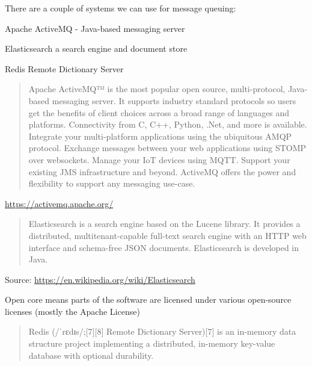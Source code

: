 \documentclass[Screen16to9,17pt]{foils}
\begin{document}

There are a couple of systems we can use for message queuing:
\begin{list2}
\item Apache ActiveMQ -  Java-based messaging server
\item Elasticsearch a search engine and document store
\item Redis Remote Dictionary Server
\end{list2}


\begin{quote}
Apache ActiveMQ™ is the most popular open source, multi-protocol, Java-based messaging server. It supports industry standard protocols so users get the benefits of client choices across a broad range of languages and platforms. Connectivity from C, C++, Python, .Net, and more is available. Integrate your multi-platform applications using the ubiquitous AMQP protocol. Exchange messages between your web applications using STOMP over websockets. Manage your IoT devices using MQTT. Support your existing JMS infrastructure and beyond. ActiveMQ offers the power and flexibility to support any messaging use-case.
\end{quote}

\url{https://activemq.apache.org/}



\begin{quote}
Elasticsearch is a search engine based on the Lucene library. It provides a distributed, multitenant-capable full-text search engine with an HTTP web interface and schema-free JSON documents. Elasticsearch is developed in Java.
\end{quote}

Source: \url{https://en.wikipedia.org/wiki/Elasticsearch}

\begin{list2}
\item Open core means parts of the software are licensed under various open-source licenses (mostly the Apache License)
\item
\item
\end{list2}


\begin{quote}
Redis (/ˈrɛdɪs/;[7][8] Remote Dictionary Server)[7] is an in-memory data structure
project implementing a distributed, in-memory key-value database with optional durability.
\end{quote}
\end{document}
